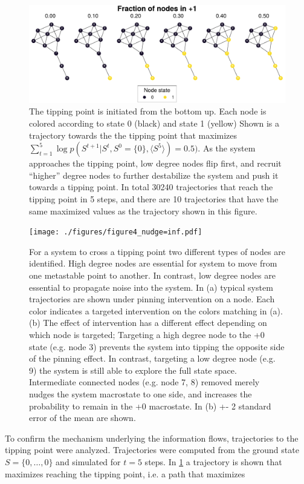 \documentclass[a4paper, 11pt, twocolumn]{article}
\begin{document}
\begin{figure}
\centering
\includegraphics[width=.9\linewidth]{./figures/kite_maximized_trajectory_30230.pdf}
\caption{\label{fig:max_trajectory}The tipping point is initiated from the bottom up. Each node is colored according to state 0 (black) and state 1 (yellow) Shown is a trajectory towards the the tipping point that maximizes \(\sum_{{t=1}}^{{5}} \log p(S^{{t+1}} | S^t, S^0 =\{0\}, \langle S^5 \rangle ) = 0.5)\). As the system approaches the tipping point, low degree nodes flip first, and recruit ``higher'' degree nodes to further destabilize the system and push it towards a tipping point. In total 30240 trajectories that reach the tipping point in 5 steps, and there are 10 trajectories that have the same maximized values as the trajectory shown in this figure.}
\end{figure}

\begin{figure}
\centering
\texttt{[image: ./figures/figure4\_nudge=inf.pdf]}
\caption{\label{fig:kite_noise}For a system to cross a tipping point two different types of nodes are identified. High degree nodes are essential for system to move from one metastable point to another. In contrast, low degree nodes are essential to propagate noise into the system. In (a) typical system trajectories are shown under pinning intervention on a node. Each color indicates a targeted intervention on the colors matching in (a). (b) The effect of intervention has a different effect depending on which node is targeted; Targeting a high degree node to the +0 state (e.g. node 3) prevents the system into tipping the opposite side of the pinning effect. In contrast, targeting a low degree node (e.g. 9) the system is still able to explore the full state space. Intermediate connected nodes (e.g. node 7, 8) removed merely nudges the system macrostate to one side, and increases the probability to remain in the +0 macrostate. In (b) +- 2 standard error of the mean are shown.}
\end{figure}

To confirm  the mechanism underlying the  information flows,
trajectories   to   the   tipping   point   were   analyzed.
Trajectories were computed from the  ground state \(S = \{0,
\dots,   0\}\)  and   simulated   for   \(t=5\)  steps.   In
\cref{fig:max_trajectory}  a  trajectory
is shown that  maximizes reaching the tipping  point, i.e. a
path that maximizes
\end{document}
